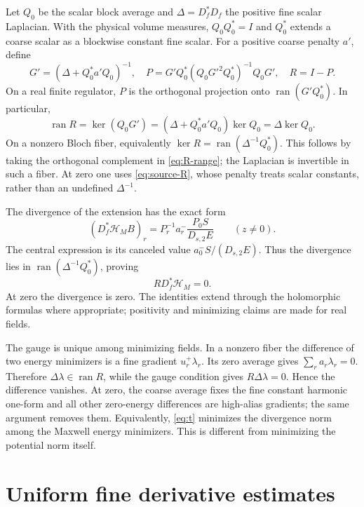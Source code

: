 \documentclass[11pt]{article}
\theoremstyle{remark}
\newcommand{\ran}{\operatorname{ran}}
\newcommand{\HH}{\mathcal H}
\begin{document}
Let $Q_0$ be the scalar block average and
$\Delta=D_f^*D_f$ the positive fine scalar Laplacian. With the
physical volume measures, $Q_0Q_0^*=I$ and $Q_0^*$ extends a
coarse scalar as a blockwise constant fine scalar. For a positive
coarse penalty $a'$, define
\begin{equation}\label{eq:source-R}
 G'=(\Delta+Q_0^*a'Q_0)^{-1},\quad
 P=G'Q_0^*(Q_0G'^2Q_0^*)^{-1}Q_0G',\quad R=I-P.
\end{equation}
On a real finite regulator, $P$ is the orthogonal projection onto
$\ran(G'Q_0^*)$. In particular,
\begin{equation}\label{eq:R-range}
 \ran R=\ker(Q_0G')
         =(\Delta+Q_0^*a'Q_0)\ker Q_0
         =\Delta\ker Q_0.
\end{equation}
On a nonzero Bloch fiber, equivalently
$\ker R=\ran(\Delta^{-1}Q_0^*)$. This follows by taking the
orthogonal complement in \eqref{eq:R-range}; the Laplacian is
invertible in such a fiber. At zero one uses \eqref{eq:source-R},
whose penalty treats scalar constants, rather than an undefined
$\Delta^{-1}$.

The divergence of the extension has the exact form
\begin{equation}\label{eq:divergence}
 (D_f^*\HH_MB)_r
    =P_r^{-1}a_r^-\frac{P_0S}{D_{s,2}E}\qquad(z\ne0).
\end{equation}
The central expression is its canceled value
$a_0^-S/(D_{s,2}E)$. Thus the divergence lies in
$\ran(\Delta^{-1}Q_0^*)$, proving
\begin{equation}\label{eq:gauge}
 R D_f^*\HH_M=0.
\end{equation}
At zero the divergence is zero. The identities extend through the
holomorphic formulas where appropriate; positivity and minimizing
claims are made for real fields.

The gauge is unique among minimizing fields. In a nonzero fiber
the difference of two energy minimizers is a fine gradient
$u_r^+\lambda_r$. Its zero average gives $\sum_ra_r\lambda_r=0$.
Therefore $\Delta\lambda\in\ran R$, while the gauge condition
gives $R\Delta\lambda=0$. Hence the difference vanishes. At zero,
the coarse average fixes the fine constant harmonic one-form and
all other zero-energy differences are high-alias gradients; the
same argument removes them. Equivalently, \eqref{eq:t} minimizes
the divergence norm among the Maxwell energy minimizers. This is
different from minimizing the potential norm itself.

\section{Uniform fine derivative estimates}
\end{document}
